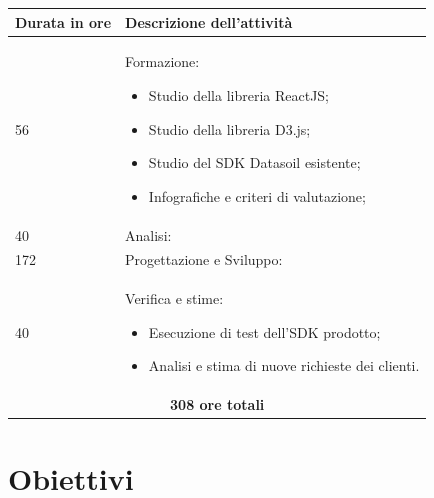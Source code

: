 \documentclass[a4paper, 12pt]{article}
\begin{document}
\begin{center}
    \begin{tabular}{ |p{3cm}|p{7cm}|  }
        \hline
        \textbf{Durata in ore} & \textbf{Descrizione dell'attività} \\
        \hline
        56                     & Formazione:

        \begin{itemize}
            \item Studio della libreria ReactJS;
            \item Studio della libreria D3.js;
            \item Studio del SDK Datasoil esistente;
            \item Infografiche e criteri di valutazione;
        \end{itemize}

        \\ \hline
        40                     & Analisi:


        \\ \hline
        172                    & Progettazione e Sviluppo:


        \\ \hline
        40                     & Verifica e stime:

        \begin{itemize}
            \item Esecuzione di test dell'SDK prodotto;
            \item Analisi e stima di nuove richieste dei clienti.
        \end{itemize}

        \\ \hline
        \multicolumn{2}{|c|}{\textbf{308 ore totali}}               \\ \hline
    \end{tabular}
\end{center}

\clearpage

\section{Obiettivi}
\end{document}
